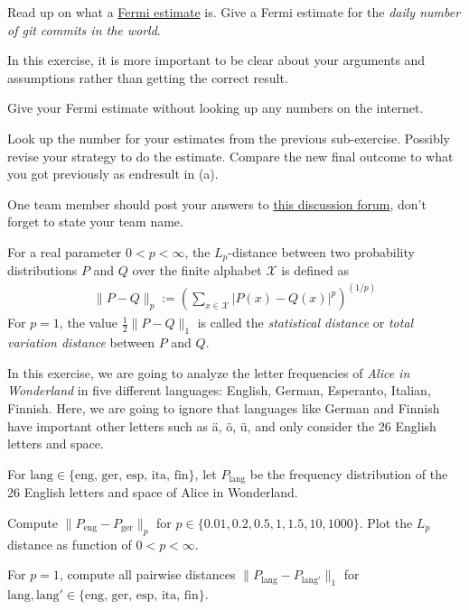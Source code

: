 \documentclass[a4paper,10pt,landscape,twocolumn]{scrartcl}
\begin{document}
\begin{exercise}
Read up on what a
\href{https://en.wikipedia.org/wiki/Fermi_problem}{Fermi estimate}
is. Give a Fermi estimate for the \emph{daily number of git commits
in the world}.
 
In this exercise, it is more important to be clear about your
arguments and assumptions rather than getting the correct result.

\begin{subex}[(4pt)]
Give your Fermi estimate without looking up any numbers on the internet.
\end{subex}

\begin{subex}[(4pt)]
Look up the number for your estimates from the previous
sub-exercise. Possibly revise your strategy to do the
estimate. Compare the new final outcome to what you got previously as
endresult in (a).
\end{subex}

One team member should post your answers to
\href{https://canvas.uva.nl/courses/2205/discussion_topics/23268}{this
  discussion forum}, don't forget to state your team name.
\end{exercise}

\begin{exercise}[Programming... (5pt)]
For a real parameter $0 < p < \infty$, the $L_p$-distance between two probability distributions $P$ and $Q$
over the finite alphabet $\mathcal{X}$ is defined as 
\begin{align*}
\| P - Q \|_p := \left( \sum_{x \in \mathcal{X} } | P(x) - Q(x) |^p \right) ^{(1/p)}
\end{align*}
For $p=1$, the value $\frac12 \| P - Q \|_1$ is called the
\emph{statistical distance} or \emph{total variation distance} 
  between $P$ and $Q$.

In this exercise, we are going to analyze the letter frequencies of \emph{Alice in
  Wonderland} in five different languages: English, German, Esperanto,
Italian, Finnish. Here, we are going to ignore that languages like German and Finnish have important other letters such as {\"a}, {\"o}, {\"u}, and only consider the 26 English letters and space.

\newcommand{\lang}{\textrm{lang}}
For $\lang \in \{ \textrm{eng, ger, esp, ita, fin} \}$, let $P_{\lang}$ be the frequency distribution of the 26 English letters and space of Alice in Wonderland.

\begin{subex}
Compute $\| P_{\textrm{eng}} - P_{\textrm{ger}} \|_p$ for $p \in \{0.01, 0.2, 0.5, 1, 1.5, 10, 1000\}$. Plot the $L_p$ distance as function of $0 < p < \infty$.
\end{subex}

\begin{subex}
For $p=1$, compute all pairwise distances $\| P_{\lang} - P_{\lang'} \|_1$ for $\lang, \lang' \in \{ \textrm{eng, ger, esp, ita, fin} \}$.
\end{subex}

\begin{subex}

\end{subex}

\end{exercise}
\end{document}
